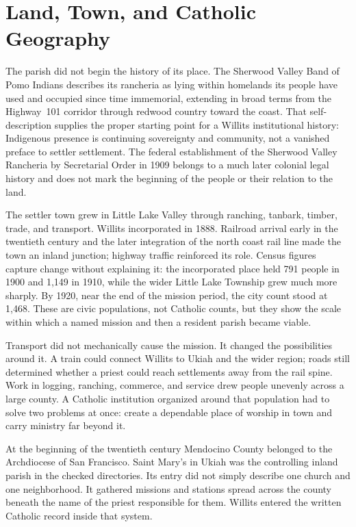 \section{Land, Town, and Catholic Geography}

The parish did not begin the history of its place. The Sherwood Valley Band of Pomo Indians describes its rancheria as lying within homelands its people have used and occupied since time immemorial, extending in broad terms from the Highway~101 corridor through redwood country toward the coast. That self-description supplies the proper starting point for a Willits institutional history: Indigenous presence is continuing sovereignty and community, not a vanished preface to settler settlement. The federal establishment of the Sherwood Valley Rancheria by Secretarial Order in 1909 belongs to a much later colonial legal history and does not mark the beginning of the people or their relation to the land.

The settler town grew in Little Lake Valley through ranching, tanbark, timber, trade, and transport. Willits incorporated in 1888. Railroad arrival early in the twentieth century and the later integration of the north coast rail line made the town an inland junction; highway traffic reinforced its role. Census figures capture change without explaining it: the incorporated place held 791 people in 1900 and 1,149 in 1910, while the wider Little Lake Township grew much more sharply. By 1920, near the end of the mission period, the city count stood at 1,468. These are civic populations, not Catholic counts, but they show the scale within which a named mission and then a resident parish became viable.

Transport did not mechanically cause the mission. It changed the possibilities around it. A train could connect Willits to Ukiah and the wider region; roads still determined whether a priest could reach settlements away from the rail spine. Work in logging, ranching, commerce, and service drew people unevenly across a large county. A Catholic institution organized around that population had to solve two problems at once: create a dependable place of worship in town and carry ministry far beyond it.

At the beginning of the twentieth century Mendocino County belonged to the Archdiocese of San Francisco. Saint Mary's in Ukiah was the controlling inland parish in the checked directories. Its entry did not simply describe one church and one neighborhood. It gathered missions and stations spread across the county beneath the name of the priest responsible for them. Willits entered the written Catholic record inside that system.

